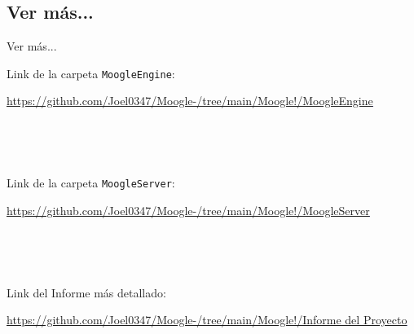 \subsection{Ver más...}
\begin{frame}[fragile]{Ver más...}

{\small{Link de la carpeta \texttt{MoogleEngine}:}}


\textcolor{blue}{\underline{\tiny\url{https://github.com/Joel0347/Moogle-/tree/main/Moogle!/MoogleEngine}}}


\ 


\ 


{\small{Link de la carpeta \texttt{MoogleServer}:}}


\textcolor{blue}{\underline{\tiny\url{https://github.com/Joel0347/Moogle-/tree/main/Moogle!/MoogleServer}}}


\ 


\


{\small {Link del Informe más detallado:}}


\textcolor{blue}{\underline{\tiny\url{https://github.com/Joel0347/Moogle-/tree/main/Moogle!/Informe del Proyecto}}}

\end{frame}
